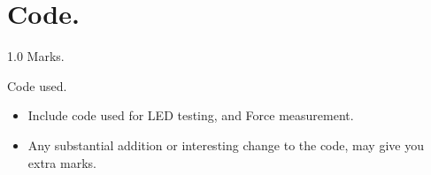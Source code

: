 \documentclass[journal]{IEEEtran}
\begin{document}

%


\appendices
\section{Code.}
\begin{flushright} 1.0 Marks. \end{flushright}
Code used.
\begin{itemize}

    \item  Include code used for LED testing, and Force measurement.
    \item  Any substantial addition or interesting change to the code, may give you extra marks.

\end{itemize}


%
%
%
\end{document}
